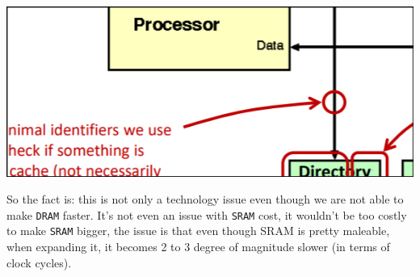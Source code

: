 \begin{center}
\includegraphics[scale=0.3]{screenshots/2025-10-17_7.png}
\end{center}


So the fact is: this is not only a technology issue even though we are not able to make \texttt{DRAM} faster. It's not even an issue with \texttt{SRAM} cost, it wouldn't be too costly to make \texttt{SRAM} bigger, the issue is that even though SRAM is pretty maleable, when expanding it, it becomes 2 to 3 degree of magnitude slower (in terms of clock cycles).

